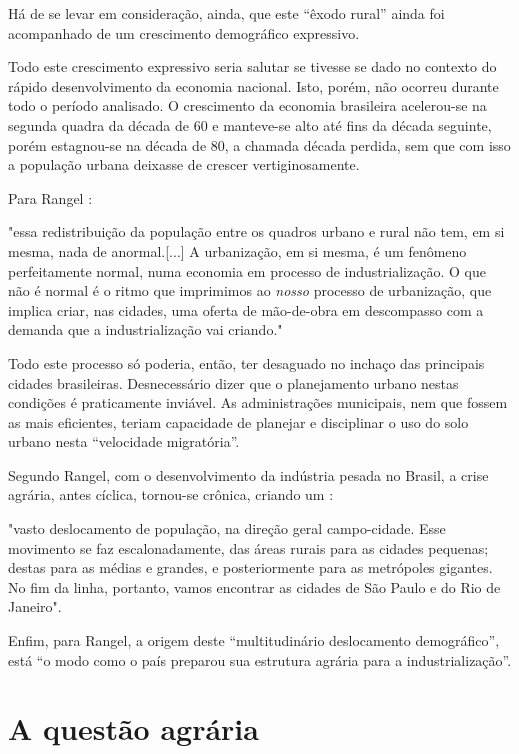\documentclass[
	12pt,				%
	oneside,			%
	a4paper,			%
	chapter=TITLE,		%
	section=TITLE,		%
	english,			%
	brazil				%
	]{abntex2}
\begin{document}
Há de se levar em consideração, ainda, que este ``êxodo rural'' ainda foi
acompanhado de um crescimento demográfico expressivo.

Todo este crescimento expressivo seria salutar se tivesse se dado no contexto do
rápido desenvolvimento da economia nacional. Isto, porém, não ocorreu durante
todo o período analisado. O crescimento da economia brasileira acelerou-se na
segunda quadra da década de 60 e manteve-se alto até fins da década seguinte,
porém estagnou-se na década de 80, a chamada década perdida, sem que com isso a
população urbana deixasse de crescer vertiginosamente.

Para Rangel \autocite*[151]{rangel1986a}:
\begin{citacao}
"essa redistribuição da população entre os quadros urbano e rural não tem, em si
mesma, nada de anormal.[...] A urbanização, em si mesma, é um fenômeno
perfeitamente normal, numa economia em processo de industrialização. O que não é
normal é o ritmo que imprimimos ao \emph{nosso} processo de urbanização, que
implica criar, nas cidades, uma oferta de mão-de-obra em descompasso com a
demanda que a industrialização vai criando."
\end{citacao}
Todo este processo só poderia, então, ter desaguado no inchaço das principais
cidades brasileiras. Desnecessário dizer que o planejamento urbano nestas
condições é praticamente inviável. As administrações municipais, nem que fossem
as mais eficientes, teriam capacidade de planejar e disciplinar o uso do solo
urbano nesta ``velocidade migratória''.

Segundo Rangel, com o desenvolvimento da indústria pesada no Brasil, a crise
agrária, antes cíclica, tornou-se crônica, criando um \autocite*[156-157]{rangel1988}:
\begin{citacao}
"vasto deslocamento de população, na direção geral campo-cidade. Esse movimento
se faz escalonadamente, das áreas rurais para as cidades pequenas; destas para
as médias e grandes, e posteriormente para as metrópoles gigantes. No fim da
linha, portanto, vamos encontrar as cidades de São Paulo e do Rio de Janeiro".
\end{citacao}
Enfim, para Rangel, a origem deste ``multitudinário deslocamento demográfico'',
está ``o modo como o país preparou sua estrutura agrária para a industrialização''.

\hypertarget{a-questuxe3o-agruxe1ria}{%
\section{A questão agrária}\label{a-questuxe3o-agruxe1ria}}
\end{document}
